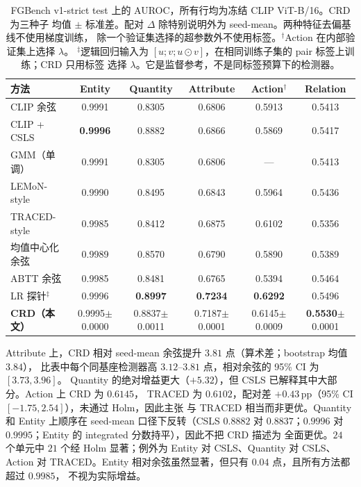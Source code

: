 \documentclass[10pt,twocolumn,a4paper]{ctexart}
\begin{document}
\begin{table}[t]
\centering
\small
\setlength{\tabcolsep}{7pt}
\caption{FGBench v1-strict test 上的 AUROC，所有行均为冻结 CLIP ViT-B/16。CRD 为三种子
均值 $\pm$ 标准差。配对 $\Delta$ 除特别说明外为 seed-mean。两种特征去偏基线不使用梯度训练，
除一个验证集选择的超参数外不使用标签。$^\dagger$Action 在内部验证集上选择 $\lambda$。
$^\ddagger$逻辑回归输入为 $[u;v;u\odot v]$，在相同训练子集的 pair 标签上训练；CRD 只用标签
选择 $\lambda$。它是监督参考，不是同标签预算下的检测器。}
\label{tab:main-cn}
\begin{tabular}{lccccc}
\toprule
方法 & Entity & Quantity & Attribute & Action$^\dagger$ & Relation \\
\midrule
CLIP 余弦                & 0.9991 & 0.8305 & 0.6806 & 0.5913 & 0.5413 \\
CLIP + CSLS              & \textbf{0.9996} & 0.8882 & 0.6866 & 0.5869 & 0.5417 \\
GMM（单调）              & 0.9991 & 0.8305 & 0.6806 & --- & 0.5413 \\
LEMoN-style              & 0.9990 & 0.8495 & 0.6843 & 0.5964 & 0.5436 \\
TRACED-style             & 0.9985 & 0.8412 & 0.6875 & 0.6102 & 0.5356 \\
均值中心化余弦            & 0.9989 & 0.8570 & 0.6790 & 0.5890 & 0.5389 \\
ABTT 余弦                & 0.9985 & 0.8481 & 0.6765 & 0.5394 & 0.5464 \\
LR 探针$^\ddagger$       & 0.9996 & \textbf{0.8997} & \textbf{0.7234} & \textbf{0.6292} & 0.5496 \\
\textbf{CRD（本文）}      & 0.9995$\pm$0.0000 & 0.8837$\pm$0.0011 & 0.7187$\pm$0.0001 & 0.6145$\pm$0.0009 & \textbf{0.5530}$\pm$0.0001 \\
\bottomrule
\end{tabular}
\end{table}

Attribute 上，CRD 相对 seed-mean 余弦提升 $3.81$ 点（算术差；bootstrap 均值 $3.84$），
比表中每个同基座检测器高 $3.12$--$3.81$ 点，相对余弦的 95\% CI 为 $[3.73,3.96]$。
Quantity 的绝对增益更大（$+5.32$），但 CSLS 已解释其中大部分。Action 上 CRD 为 $0.6145$，
TRACED 为 $0.6102$，配对差 $+0.43$\,pp（95\% CI $[-1.75,2.54]$），未通过 Holm，因此主张
与 TRACED 相当而非更优。Quantity 和 Entity 上顺序在 seed-mean 口径下反转（CSLS $0.8882$
对 $0.8837$；$0.9996$ 对 $0.9995$；Entity 的 integrated 分数持平），因此不把 CRD 描述为
全面更优。$24$ 个单元中 $21$ 个经 Holm 显著；例外为 Entity 对 CSLS、Quantity 对 CSLS、
Action 对 TRACED。Entity 相对余弦虽然显著，但只有 $0.04$ 点，且所有方法都超过 $0.9985$，
不视为实际增益。
\end{document}
